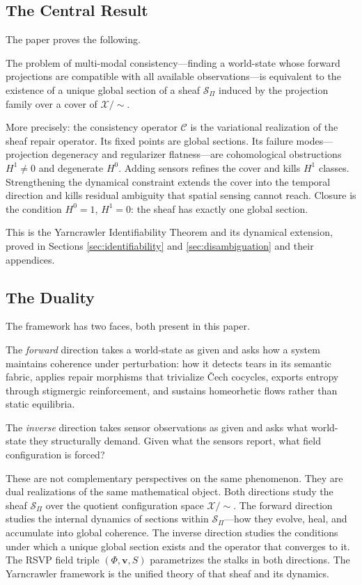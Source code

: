 \documentclass[11pt, oneside]{article}
\newcommand{\Xmod}{\mathcal{X}/{\sim}}
\begin{document}
\subsection{The Central Result}

The paper proves the following.

The problem of multi-modal consistency---finding a world-state whose forward projections
are compatible with all available observations---is equivalent to the existence of a unique
global section of a sheaf $\mathcal{S}_\Pi$ induced by the projection family over a cover
of $\Xmod$.

More precisely: the consistency operator $\mathcal{C}$ is the variational realization of
the sheaf repair operator. Its fixed points are global sections. Its failure modes---
projection degeneracy and regularizer flatness---are cohomological obstructions $H^1 \ne 0$
and degenerate $H^0$. Adding sensors refines the cover and kills $H^1$ classes.
Strengthening the dynamical constraint extends the cover into the temporal direction and
kills residual ambiguity that spatial sensing cannot reach. Closure is the condition
$H^0 = 1$, $H^1 = 0$: the sheaf has exactly one global section.

This is the Yarncrawler Identifiability Theorem and its dynamical extension, proved in
Sections \ref{sec:identifiability} and \ref{sec:disambiguation} and their appendices.

\subsection{The Duality}

The framework has two faces, both present in this paper.

The \emph{forward} direction takes a world-state as given and asks how a system maintains
coherence under perturbation: how it detects tears in its semantic fabric, applies repair
morphisms that trivialize \v{C}ech cocycles, exports entropy through stigmergic
reinforcement, and sustains homeorhetic flows rather than static equilibria.

The \emph{inverse} direction takes sensor observations as given and asks what world-state
they structurally demand. Given what the sensors report, what field configuration is forced?

These are not complementary perspectives on the same phenomenon. They are dual realizations
of the same mathematical object. Both directions study the sheaf $\mathcal{S}_\Pi$ over the
quotient configuration space $\Xmod$. The forward direction studies the internal dynamics
of sections within $\mathcal{S}_\Pi$---how they evolve, heal, and accumulate into global
coherence. The inverse direction studies the conditions under which a unique global section
exists and the operator that converges to it. The RSVP field triple $(\Phi, \mathbf{v}, S)$
parametrizes the stalks in both directions. The Yarncrawler framework is the unified theory
of that sheaf and its dynamics.
\end{document}
